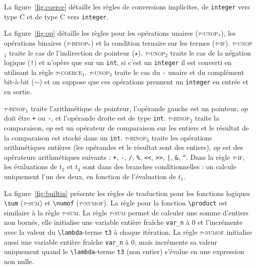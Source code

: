 La figure~\ref{fig:coerce} détaille les règles de conversions implicites, de
\lstinline'integer' vers type C et de type C vers \lstinline'integer'.

La figure~\ref{fig:op} détaille les règles pour les opérations unaires
(\textsc{$\tau$-unop$_*$}), les opérations binaires (\textsc{$\tau$-binop$_*$}) 
et la condition ternaire sur les termes (\textsc{$\tau$-if}).
\textsc{$\tau$-unop$_1$} traite le cas de l'indirection de pointeur ($\star$).
\textsc{$\tau$-unop$_2$} traite le cas de la négation logique (\lstinline|!|) et
n'opère que sur un \lstinline'int', si c'est un \lstinline'integer' il est
converti en utilisant la règle \textsc{$\tau$-coerce$_1$}.
\textsc{$\tau$-unop$_3$} traite le cas du \lstinline|-| unaire et du complément
bit-à-bit ($\sim$) et on suppose que ces opérations prennent un
\lstinline'integer' en entrée et en sortie.

\textsc{$\tau$-binop$_1$} traite l'arithmétique de pointeur, l'opérande gauche
est un pointeur, $op$ doit être \lstinline|+| ou \lstinline|-|, et l'opérande
droite est de type \lstinline'int'.
\textsc{$\tau$-binop$_2$} traite la comparaison, $op$ est un opérateur de
comparaison sur les entiers et le résultat de la comparaison est stocké dans un
\lstinline|int|.
\textsc{$\tau$-binop$_3$} traite les opérations arithmétiques entières (les
opérandes et le résultat sont des entiers), $op$ est des opérateurs
arithmétiques suivants : \lstinline|+|, \lstinline|-|, \lstinline|/|,
\lstinline|%|, \lstinline|<<|, \lstinline|>>|, \lstinline{|}, \lstinline|&|,
\lstinline|^|.
Dans la règle \textsc{$\tau$-if}, les évaluations de $t_2$ et $t_3$ sont dans
des branches conditionnelles : on calcule uniquement l'un des deux, en fonction
de l'évaluation de $t_1$.

La figure~\ref{fig:builtin} présente les règles de traduction pour les fonctions
logiques \lstinline|\sum| (\textsc{$\tau$-sum}) et \lstinline|\numof|
(\textsc{$\tau$-numof}).
La règle pour la fonction \lstinline|\product| est similaire à la règle
\textsc{$\tau$-sum}.
La règle \textsc{$\tau$-sum} permet de calculer une somme d'entiers non bornés,
elle initialise une variable entière fraîche \lstinline|var_n| à $0$ et
l'incrémente avec la valeur du \lstinline|\lambda|-terme \lstinline't3' à chaque
itération.
La règle \textsc{$\tau$-numof} initialise aussi une variable entière fraîche
\lstinline|var_n| à $0$, mais incrémente sa valeur uniquement quand le
\lstinline|\lambda|-terme \lstinline't3' (non entier) s'évalue en une expression
non nulle.



